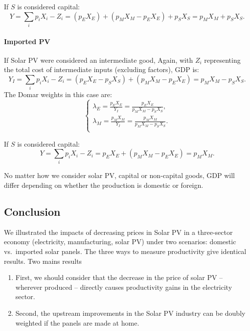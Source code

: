 \documentclass[11pt]{article}
\begin{document}
If $S$ is considered capital: 
\begin{equation}
     Y = \sum_i p_i X_i - Z_i = (p_E X_E) + (p_M X_M - p_E X_E) + p_S X_S = p_M X_M +  p_S X_S.
\end{equation}

\paragraph{Imported PV}  
If Solar PV were considered an intermediate good,
Again, with $Z_i$ representing the total cost of intermediate inputs (excluding factors), GDP is:
\begin{equation}
     Y_I = \sum_i p_i X_i - Z_i = (p_E X_E - p_S X_S) + (p_M X_M - p_E X_E) = p_M X_M - p_S X_S.
\end{equation}
The Domar weights in this case are:
\begin{equation}
    \begin{cases}
        \lambda_E = \frac{p_E X_E}{Y_I} = \frac{p_E X_E}{p_M X_M - p_S X_S},\\
        \lambda_M = \frac{p_M X_M}{Y_I} = \frac{p_M X_M}{p_M X_M - p_S X_S}.\\
    \end{cases}
\end{equation}

If $S$ is considered capital: 
\begin{equation}
     Y =  \sum_i p_i X_i - Z_i = p_E X_E + (p_M X_M - p_E X_E) = p_M X_M.
\end{equation}

No matter how we consider solar PV, capital or non-capital goods, GDP will differ depending on whether the production is domestic or foreign.

\subsection{Conclusion}
We illustrated the impacts of decreasing prices in Solar PV in a three-sector economy (electricity, manufacturing, solar PV) under two scenarios: domestic vs.\ imported solar panels. The three ways to measure productivity give identical results. 
Two mains results
\begin{enumerate}
    \item First, we should consider that the decrease in the price of solar PV -- wherever produced -- directly causes productivity gains in the electricity sector.
    \item Second, the upstream improvements in the Solar PV industry can be doubly weighted if the panels are made at home.
\end{enumerate}
\end{document}
